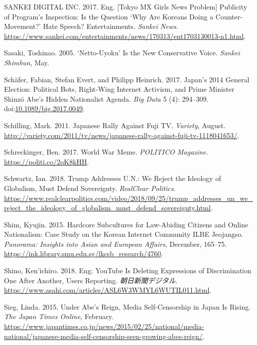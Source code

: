 \documentclass[10pt,british,A4paper,,openany]{memoir}
\begin{document}
\hypertarget{ref-sankei_digital_inc_eng._2017}{}
SANKEI DIGITAL INC. 2017. Eng. {[}Tokyo MX Girls News Problem{]}
Publicity of Program's Inspection: Is the Question `Why Are Koreans
Doing a Counter-Movement?' Hate Speech? Entertainments. \emph{Sankei
News}.
\url{https://www.sankei.com/entertainments/news/170313/ent1703130013-n1.html}.

\hypertarget{ref-sasaki_netto-uyoku_2005}{}
Sasaki, Toshinao. 2005. `Netto-Uyoku' Is the New Conservative Voice.
\emph{Sankei Shimbun}, May.

\hypertarget{ref-schafer_japans_2017}{}
Schäfer, Fabian, Stefan Evert, and Philipp Heinrich. 2017. Japan's 2014
General Election: Political Bots, Right-Wing Internet Activism, and
Prime Minister Shinzō Abe's Hidden Nationalist Agenda. \emph{Big Data} 5
(4): 294--309.
doi:\href{https://doi.org/10.1089/big.2017.0049}{10.1089/big.2017.0049}.

\hypertarget{ref-schilling_japanese_2011}{}
Schilling, Mark. 2011. Japanese Rally Against Fuji TV. \emph{Variety},
August.
\url{http://variety.com/2011/tv/news/japanese-rally-against-fuji-tv-1118041653/}.

\hypertarget{ref-schreckinger_world_2017}{}
Schreckinger, Ben. 2017. World War Meme. \emph{POLITICO Magazine}.
\url{https://politi.co/2qK8kHH}.

\hypertarget{ref-schwartz_trump_2018}{}
Schwartz, Ian. 2018. Trump Addresses U.N.: We Reject the Ideology of
Globalism, Must Defend Sovereignty. \emph{RealClear Politics}.
\url{https://www.realclearpolitics.com/video/2018/09/25/trump_addresses_un_we_reject_the_ideology_of_globalism_must_defend_sovereignty.html}.

\hypertarget{ref-shim_hardcore_2015}{}
Shim, Kyujin. 2015. Hardcore Subcultures for Law-Abiding Citizens and
Online Nationalism: Case Study on the Korean Internet Community ILBE
Jeojangso. \emph{Panorama: Insights into Asian and European Affairs},
December, 165--75.
\url{https://ink.library.smu.edu.sg/lkcsb_research/4760}.

\hypertarget{ref-shino_eng:_2018}{}
Shino, Ken'ichiro. 2018. Eng: YouTube Is Deleting Expressions of
Discrimination One After Another, Users Reporting.
\emph{朝日新聞デジタル}.
\url{https://www.asahi.com/articles/ASL6W3WMYL6WUTIL011.html}.

\hypertarget{ref-sieg_under_2015}{}
Sieg, Linda. 2015. Under Abe's Reign, Media Self-Censorship in Japan Is
Rising. \emph{The Japan Times Online}, February.
\url{https://www.japantimes.co.jp/news/2015/02/25/national/media-national/japanese-media-self-censorship-seen-growing-abes-reign/}.
\end{document}
